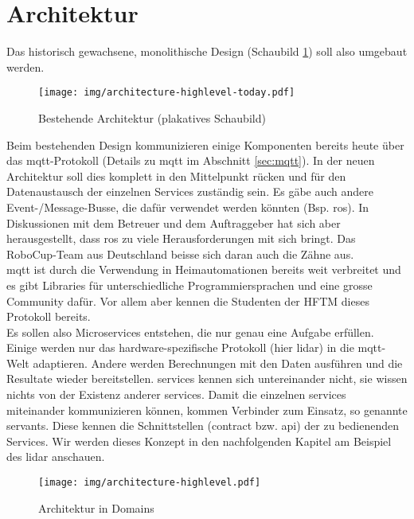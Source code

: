 \section{Architektur}
\label{sec:Architektur}
Das historisch gewachsene, monolithische Design (Schaubild \ref{fig:architecture_current_highlevel}) soll also umgebaut werden.
\begin{figure}[H]
	\centering
	\texttt{[image: img/architecture-highlevel-today.pdf]}
	\caption{Bestehende Architektur (plakatives Schaubild)}
	\label{fig:architecture_current_highlevel}
\end{figure}
Beim bestehenden Design kommunizieren einige Komponenten bereits heute über das \acrshort{mqtt}-Protokoll (Details zu \acrshort{mqtt} im Abschnitt \ref{sec:mqtt}). In der neuen Architektur soll dies komplett in den Mittelpunkt rücken und für den Datenaustausch der einzelnen Services zuständig sein. Es gäbe auch andere Event-/Message-Busse, die dafür verwendet werden könnten (Bsp. \Gls{ros}). In Diskussionen mit dem Betreuer und dem Auftraggeber hat sich aber herausgestellt, dass \Gls{ros} zu viele Herausforderungen mit sich bringt. Das RoboCup-Team aus Deutschland beisse sich daran auch die Zähne aus. \\
\acrshort{mqtt} ist durch die Verwendung in Heimautomationen bereits weit verbreitet und es gibt Libraries für unterschiedliche Programmiersprachen und eine grosse Community dafür. Vor allem aber kennen die Studenten der HFTM dieses Protokoll bereits. \\ Es sollen also Microservices entstehen, die nur genau eine Aufgabe erfüllen. Einige werden nur das hardware-spezifische Protokoll (hier \acrshort{lidar}) in die \acrshort{mqtt}-Welt adaptieren. Andere werden Berechnungen mit den Daten ausführen und die Resultate wieder bereitstellen. \Glspl{service} kennen sich untereinander nicht, sie wissen nichts von der Existenz anderer \glspl{service}. Damit die einzelnen \Glspl{service} miteinander kommunizieren können, kommen Verbinder zum Einsatz,  so genannte \Glspl{servant}. Diese kennen die Schnittstellen (\gls{contract} bzw. \acrshort{api}) der zu bedienenden Services. Wir werden dieses Konzept in den nachfolgenden Kapitel am Beispiel des \acrshort{lidar} anschauen.

\begin{figure}[H]
	\centering
	\texttt{[image: img/architecture-highlevel.pdf]}
	\caption{Architektur in Domains}
	\label{fig:architecture_highlevel}
\end{figure}

